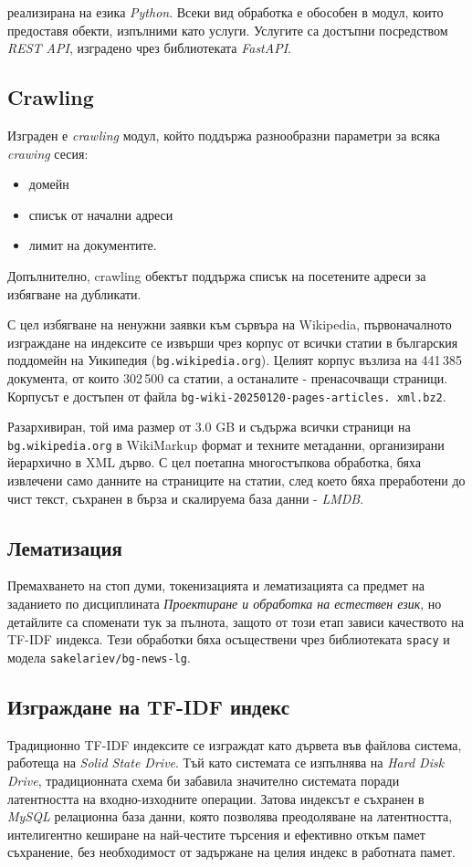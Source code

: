 \documentclass[a4paper,12pt]{article} \usepackage[utf8]{inputenc}
\begin{document}
реализирана на езика \emph{Python}. Всеки вид обработка е обособен в модул,
които предоставя обекти, изпълними като услуги. Услугите са достъпни посредством
\emph{REST API}, изградено чрез библиотеката \emph{FastAPI}.
\subsection{Crawling} Изграден е \emph{crawling} модул, който поддържа
разнообразни параметри за всяка \emph{crawing} сесия: \begin{itemize} \item
домейн \item списък от начални адреси \item лимит на документите. \end{itemize}

Допълнително, crawling обектът поддържа списък на посетените адреси за
избягване на дубликати.

С цел избягване на ненужни заявки към сървъра на Wikipedia, първоначалното
изграждане на индексите се извърши чрез корпус от всички статии в българския
поддомейн на Уикипедия (\texttt{bg.wikipedia.org}). Целият корпус възлиза на
441\,385 документа, от които 302\,500 са статии, а останалите - пренасочващи
страници. Корпусът е достъпен от файла \texttt{bg-wiki-20250120-pages-articles.
xml.bz2}\cite{wiki}.

Разархивиран, той има размер от 3.0 GB и съдържа всички страници на
\\\texttt{bg.wikipedia.org} в WikiMarkup формат и техните метаданни,
организирани йерархично в XML дърво. С цел поетапна многостъпкова обработка,
бяха извлечени само данните на страниците на статии, след което бяха преработени
до чист текст, съхранен в бърза и скалируема база данни - \emph{LMDB}\cite{lmdb}.

\subsection{Лематизация} Премахването на стоп думи, токенизацията и
лематизацията са предмет на заданието по дисциплината \emph{Проектиране и
обработка на естествен език}, но детайлите са споменати тук за пълнота, защото
от този етап зависи качеството на TF-IDF индекса. Тези обработки бяха
осъществени чрез библиотеката \texttt{spacy} и модела
\texttt{sakelariev/bg-news-lg}\cite{sakelariev_bg_news_lg}.

\subsection{Изграждане на TF-IDF индекс} Традиционно TF-IDF индексите се
изграждат като дървета във файлова система, работеща на \emph{Solid State Drive}.
Тъй като системата се изпълнява на \emph{Hard Disk Drive}, традиционната схема
би забавила значително системата поради латентността на входно-изходните
операции. Затова индексът е съхранен в \emph{MySQL} релационна база данни, която
позволява преодоляване на латентността, интелигентно кеширане на най-честите
търсения и ефективно откъм памет съхранение, без необходимост от задържане на
целия индекс в работната памет.
\end{document}

